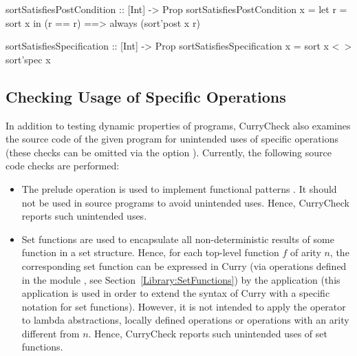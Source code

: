 \begin{curry}
sortSatisfiesPostCondition :: [Int] -> Prop
sortSatisfiesPostCondition x =
  let r = sort x
  in (r == r) ==> always (sort'post x r)

sortSatisfiesSpecification :: [Int] -> Prop
sortSatisfiesSpecification x = sort x <~> sort'spec x
\end{curry}

\subsection{Checking Usage of Specific Operations}

In addition to testing dynamic properties of programs,
CurryCheck also examines the source code of the given
program for unintended uses of specific operations
(these checks can be omitted via the option ).
Currently, the following source code checks are performed:

\begin{itemize}
\item
The prelude operation \ccode{=:<=} is used to implement
functional patterns \cite{AntoyHanus05LOPSTR}. It should not be
used in source programs to avoid unintended uses.
Hence, CurryCheck reports such unintended uses.
\item
Set functions \cite{AntoyHanus09} are used to encapsulate
all non-deterministic results of some function in a set structure.
Hence, for each top-level function $f$ of arity $n$,
the corresponding set function can be expressed in Curry
(via operations defined in the module
, see Section~\ref{Library:SetFunctions})
by the application  (this application is used
in order to extend the syntax of Curry with a specific notation
for set functions).
However, it is not intended to apply the operator 
to lambda abstractions, locally defined operations
or operations with an arity different from $n$.
Hence, CurryCheck reports such unintended uses of set functions.
\end{itemize}


